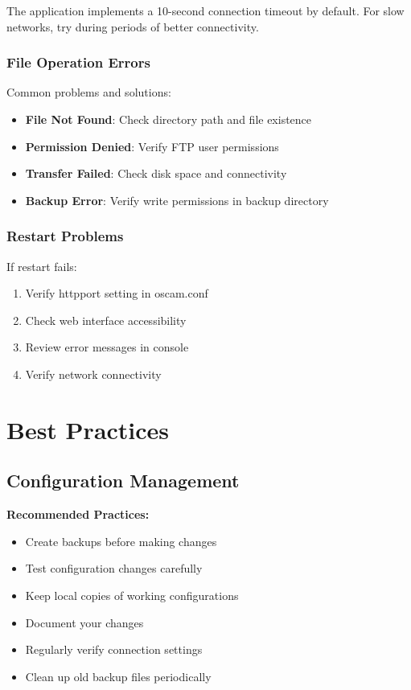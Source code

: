 \documentclass[a4paper,11pt]{report}
\begin{document}
\begin{notebox}
The application implements a 10-second connection timeout by default. For slow networks, try during periods of better connectivity.
\end{notebox}

\subsection{File Operation Errors}
\begin{warningbox}
Common problems and solutions:
\begin{itemize}
    \item \textbf{File Not Found}: Check directory path and file existence
    \item \textbf{Permission Denied}: Verify FTP user permissions
    \item \textbf{Transfer Failed}: Check disk space and connectivity
    \item \textbf{Backup Error}: Verify write permissions in backup directory
\end{itemize}
\end{warningbox}

\subsection{Restart Problems}
\begin{procedurebox}
If restart fails:
\begin{enumerate}
    \item Verify httpport setting in oscam.conf
    \item Check web interface accessibility
    \item Review error messages in console
    \item Verify network connectivity
\end{enumerate}
\end{procedurebox}

\chapter{Best Practices}

\section{Configuration Management}
\begin{tipbox}
\textbf{Recommended Practices:}
\begin{itemize}
    \item Create backups before making changes
    \item Test configuration changes carefully
    \item Keep local copies of working configurations
    \item Document your changes
    \item Regularly verify connection settings
    \item Clean up old backup files periodically
\end{itemize}
\end{tipbox}
\end{document}

